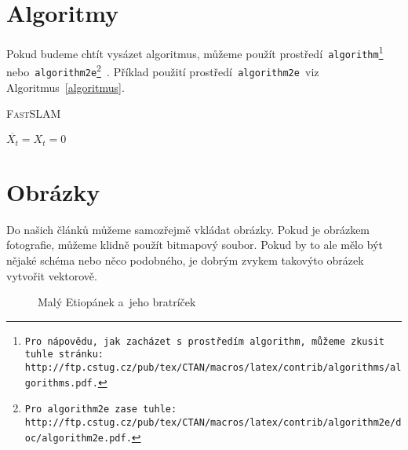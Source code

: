 \documentclass[a4paper,11pt]{article}
\begin{document}
\section{Algoritmy}
\label{SekceAlgoritmy}

Pokud budeme chtít vysázet algoritmus, můžeme použít prostředí\texttt{ algorithm\footnote{Pro nápovědu, jak zacházet s~prostředím\texttt{ algorithm,} můžeme zkusit tuhle stránku: \\ http://ftp.cstug.cz/pub/tex/CTAN/macros/latex/contrib/algorithms/algorithms.pdf.} } nebo\texttt{ algorithm2e\footnote{Pro\texttt{ algorithm2e }zase tuhle:
http://ftp.cstug.cz/pub/tex/CTAN/macros/latex/contrib/algorithm2e/doc/algorithm2e.pdf.} }. Příklad použití prostředí\texttt{ algorithm2e }viz Algoritmus~\ref{algoritmus}. \\
\IncMargin{1.5em}
\begin{algorithm}
\caption{\textsc{FastSLAM}}
\label{algoritmus}
\SetNlSty{}{}{:}
\Indm\Indmm
	\Indp\Indpp
 	\BlankLine
${\overline{{X_t}} = X_t = 0}$\\
 
\end{algorithm}
\DecMargin{1.5em}
\section{Obrázky}
Do našich článků můžeme samozřejmě vkládat obrázky. Pokud je obrázkem fotografie, můžeme klidně použít bitmapový soubor. Pokud by to ale mělo být nějaké schéma nebo něco podobného, je dobrým zvykem takovýto obrázek vytvořit vektorově.
\begin{figure}[h]
\centering
{}
\caption{Malý Etiopánek a~jeho bratríček}
\label{obrEtiop}
\end{figure}
\newpage
\end{document}
